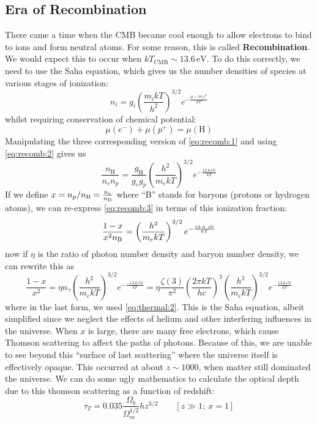 \documentclass[10pt]{article}
\numberwithin{equation}{section}
\begin{document}
\subsection{Era of Recombination} %
\label{sub:era_of_recombination}
	There came a time when the CMB became cool enough to allow electrons to bind to ions and form neutral atoms. For some reason, this is called \textbf{Recombination}. We would expect this to occur when $kT_{\mathrm{CMB}}\sim 13.6\,\mathrm{eV}$. To do this correctly, we need to use the Saha equation, which gives us the number densities of species at various stages of ionization:
	\begin{equation}
		\label{eq:recomb:1} n_i = g_i \left(\frac{m_i kT}{h^2}\right)^{3/2}e^{-\frac{\mu -m_i c^2}{kT}}
	\end{equation}
	whilst requiring conservation of chemical potential:
	\begin{equation}
		\label{eq:recomb:2} \mu(e^-) + \mu(p^+) = \mu(\mathrm{H})
	\end{equation}
	Manipulating the three corresponding version of \eqref{eq:recomb:1} and using \eqref{eq:recomb:2} gives us
	\begin{equation}
		\label{eq:recomb:3} \frac{n_{\mathrm{H}}}{n_{e}n_p} = \frac{g_\mathrm{H}}{g_eg_p} \left(\frac{h^2}{m_ekT}\right)^{3/2} e^{-\frac{13.6\,\mathrm{eV}}{kT}}
	\end{equation}
	If we define $x=n_p/n_{\mathrm{\rm B}} = \frac{n_e}{n_{\rm B}}$ where ``B'' stands for baryons (protons or hydrogen atoms), we can re-express \eqref{eq:recomb:3} in terms of this ionization fraction:
	\begin{equation}
		\label{eq:recomb:4} \frac{1-x}{x^2n_{\rm B}} = \left(\frac{h^2}{m_e kT}\right)^{3/2}e^{-\frac{13.6\ \mathrm{eV}}{kT}}
	\end{equation}
	now if $\eta$ is the ratio of photon number density and baryon number density, we can rewrite this as
	\begin{equation}
		\label{eq:recomb:5} \frac{1-x}{x^2} = \eta n_\gamma\left(\frac{h^2}{m_e kT}\right)^{3/2} e^{-\frac{-13.6\,\mathrm{eV}}{kT}} = \eta\frac{\zeta(3)}{\pi^2}\left(\frac{2\pi k T}{hc}\right)^3 \left( \frac{h^2}{m_e kT}\right)^{3/2} e^{-\frac{13.6\,\mathrm{eV}}{kT}}
	\end{equation}
	where in the last form, we used \eqref{eq:thermal:2}. This is the Saha equation, albeit simplified since we neglect the effects of helium and other interfering influences in the universe. When $x$ is large, there are many free electrons, which cause Thomson scattering to affect the paths of photons. Because of this, we are unable to see beyond this ``surface of last scattering'' where the universe itself is effectively opaque. This occurred at about $z\sim 1000$, when matter still dominated the universe. We can do some ugly mathematics to calculate the optical depth due to this thomson scattering as a function of redshift:
	\begin{equation}
		\label{eq:recomb:6} \tau_T = 0.035\frac{\Omega_b}{\Omega_m^{1/2}}hz^{3/2}\qquad [z\gg 1;\ x=1]
	\end{equation}
\end{document}
